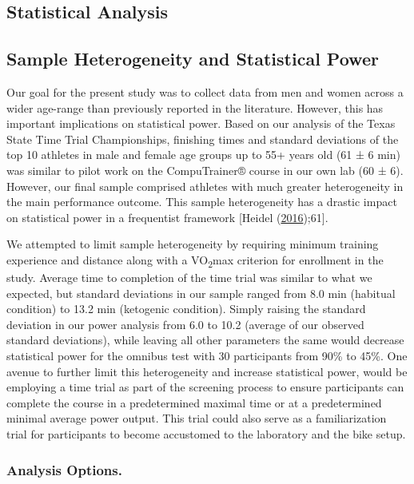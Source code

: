 \documentclass[]{cik}%
\begin{document}
\hypertarget{statistical-analysis-1}{%
\subsection{Statistical Analysis}\label{statistical-analysis-1}}

\hypertarget{sample-heterogeneity-and-statistical-power}{%
\subsection{Sample Heterogeneity and Statistical
Power}\label{sample-heterogeneity-and-statistical-power}}

Our goal for the present study was to collect data from men and women
across a wider age-range than previously reported in the literature.
However, this has important implications on statistical power. Based on
our analysis of the Texas State Time Trial Championships, finishing
times and standard deviations of the top 10 athletes in male and female
age groups up to 55+ years old (61 ± 6 min) was similar to pilot work on
the CompuTrainer® course in our own lab (60 ± 6). However, our final
sample comprised athletes with much greater heterogeneity in the main
performance outcome. This sample heterogeneity has a drastic impact on
statistical power in a frequentist framework {[}Heidel
(\protect\hyperlink{ref-60}{2016});61{]}.

We attempted to limit sample heterogeneity by requiring minimum training
experience and distance along with a VO\textsubscript{2}max criterion
for enrollment in the study. Average time to completion of the time
trial was similar to what we expected, but standard deviations in our
sample ranged from 8.0 min (habitual condition) to 13.2 min (ketogenic
condition). Simply raising the standard deviation in our power analysis
from 6.0 to 10.2 (average of our observed standard deviations), while
leaving all other parameters the same would decrease statistical power
for the omnibus test with 30 participants from 90\% to 45\%. One avenue
to further limit this heterogeneity and increase statistical power,
would be employing a time trial as part of the screening process to
ensure participants can complete the course in a predetermined maximal
time or at a predetermined minimal average power output. This trial
could also serve as a familiarization trial for participants to become
accustomed to the laboratory and the bike setup.

\hypertarget{analysis-options.}{%
\subsubsection{Analysis Options.}\label{analysis-options.}}
\end{document}
